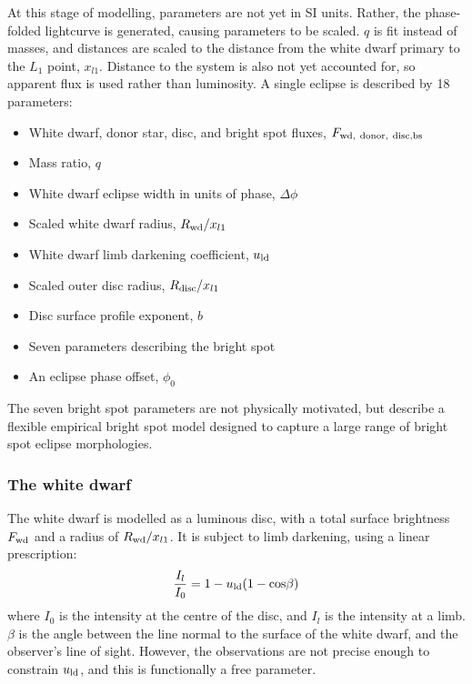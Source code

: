 At this stage of modelling, parameters are not yet in SI units.
Rather, the phase-folded lightcurve is generated, causing parameters to be scaled. $q$ is fit instead of masses, and distances are scaled to the distance from the white dwarf primary to the $L_1$ point, $x_{l1}$. Distance to the system is also not yet accounted for, so apparent flux is used rather than luminosity.
A single eclipse is described by 18 parameters:
\begin{itemize}
    \setlength\itemsep{0em}
    \item White dwarf, donor star, disc, and bright spot fluxes, $F_{\rm wd,\ donor,\ disc, bs}$
    \item Mass ratio, $q$
    \item White dwarf eclipse width in units of phase, $\Delta \phi$
    \item Scaled white dwarf radius, $R_{\rm wd} / x_{l1}$
    \item White dwarf limb darkening coefficient, $u_{\rm ld}$
    \item Scaled outer disc radius, $R_{\rm disc} / x_{l1}$
    \item Disc surface profile exponent, $b$
    \item Seven parameters describing the bright spot
    \item An eclipse phase offset, $\phi_0$
\end{itemize}
The seven bright spot parameters are not physically motivated, but describe a flexible empirical bright spot model designed to capture a large range of bright spot eclipse morphologies.

\subsubsection{The white dwarf}

The white dwarf is modelled as a luminous disc, with a total surface brightness $F_{\rm wd}$ and a radius of $R_{\rm wd} / x_{l1}$. It is subject to limb darkening, using a linear prescription:
\begin{equation}
    \frac{I_l}{I_0} = 1 - u_{\rm ld}(1 - {\rm cos}\beta)
\end{equation}
where $I_0$ is the intensity at the centre of the disc, and $I_l$ is the intensity at a limb. $\beta$ is the angle between the line normal to the surface of the white dwarf, and the observer's line of sight.
However, the observations are not precise enough to constrain $u_{\rm ld}$, and this is functionally a free parameter.

